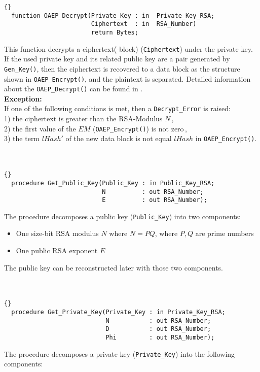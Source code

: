 \begin{lstlisting}{}
  function OAEP_Decrypt(Private_Key : in  Private_Key_RSA;
                        Ciphertext  : in  RSA_Number) 
                        return Bytes;
\end{lstlisting}
This function decrypts a ciphertext(-block) (\texttt{Ciphertext}) under the private key. If the used private key and its related public key are a pair generated by \texttt{Gen\_Key()}, then the ciphertext is recovered to a data block as the structure shown in \texttt{OAEP\_Encrypt()}, and the plaintext is separated. Detailed information about the \texttt{OAEP\_Decrypt()} can be found in \cite{PKCS}.\\
\textbf{Exception:}\\
If one of the following conditions is met, then a  \texttt{Decrypt\_Error} is raised:\\
1) the ciphertext is greater than the RSA-Modulus $N$\,,\\
2) the first value of the $EM$ (\texttt{OAEP\_Encrypt()}) is not zero\,,\\
3) the term $lHash'$ of the new data block is not equal $lHash$ in \texttt{OAEP\_Encrypt()}.\\
\hline \\ \ \\
\begin{lstlisting}{}
  procedure Get_Public_Key(Public_Key : in Public_Key_RSA;
                           N          : out RSA_Number;
                           E          : out RSA_Number);
\end{lstlisting}
The procedure decomposes a public key (\texttt{Public\_Key}) into two components:
\begin{itemize}
\item One size-bit RSA modulus $N$ where $N=PQ$, where $P,Q$ are prime numbers
\item One public RSA exponent $E$
\end{itemize}
The public key can be reconstructed later with those two components.\\
\hline \\ \ \\
\begin{lstlisting}{}
  procedure Get_Private_Key(Private_Key : in Private_Key_RSA;
                            N           : out RSA_Number;
                            D           : out RSA_Number;
                            Phi         : out RSA_Number);
\end{lstlisting}
The procedure decomposes a private key (\texttt{Private\_Key}) into the following components:
